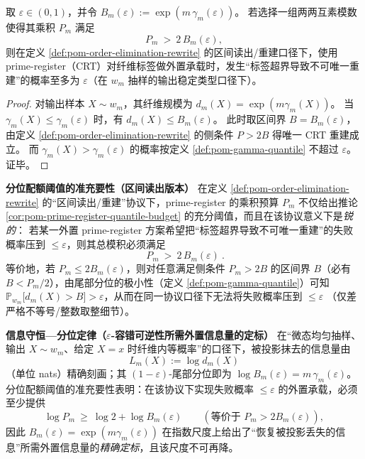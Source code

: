\begin{corollary}\label{cor:pom-prime-register-quantile-budget}
取 \(\varepsilon\in(0,1)\)，并令 \(B_m(\varepsilon):=\exp(m\,\gamma_m(\varepsilon))\)。
若选择一组两两互素模数使得其乘积 \(P_m\) 满足
$$
P_m\ >\ 2\,B_m(\varepsilon),
$$
则在定义 \ref{def:pom-order-elimination-rewrite} 的区间读出/重建口径下，使用 prime-register（CRT）对纤维标签做外置承载时，发生“标签超界导致不可唯一重建”的概率至多为 \(\varepsilon\)（在 \(w_m\) 抽样的输出稳定类型口径下）。
\end{corollary}

\begin{proof}
对输出样本 \(X\sim w_m\)，其纤维规模为 \(d_m(X)=\exp(m\gamma_m(X))\)。
当 \(\gamma_m(X)\le\gamma_m(\varepsilon)\) 时，有 \(d_m(X)\le B_m(\varepsilon)\)。
此时取区间界 \(B=B_m(\varepsilon)\)，由定义 \ref{def:pom-order-elimination-rewrite} 的侧条件 \(P>2B\) 得唯一 CRT 重建成立。
而 \(\gamma_m(X)>\gamma_m(\varepsilon)\) 的概率按定义 \ref{def:pom-gamma-quantile} 不超过 \(\varepsilon\)。证毕。
\end{proof}

\medskip\noindent\textbf{分位配额阈值的准充要性（区间读出版本）}
在定义 \ref{def:pom-order-elimination-rewrite} 的“区间读出/重建”协议下，prime-register 的乘积预算 \(P_m\) 不仅给出推论 \ref{cor:pom-prime-register-quantile-budget} 的充分阈值，而且在该协议意义下是\emph{锐的}：
若某一外置 prime-register 方案希望把“标签超界导致不可唯一重建”的失败概率压到 \(\le \varepsilon\)，则其总模积必须满足
\[
\boxed{\ P_m\ >\ 2\,B_m(\varepsilon)\ }.
\]
等价地，若 \(P_m\le 2B_m(\varepsilon)\)，则对任意满足侧条件 \(P_m>2B\) 的区间界 \(B\)（必有 \(B<P_m/2\)），由尾部分位的极小性（定义 \ref{def:pom-gamma-quantile}）可知
\(\mathbb{P}_{w_m}\!\big[d_m(X)>B\big]>\varepsilon\)，从而在同一协议口径下无法将失败概率压到 \(\le\varepsilon\)
（仅差严格不等号/整数取整细节）。

\medskip\noindent\textbf{信息守恒—分位定律（\(\varepsilon\)-容错可逆性所需外置信息量的定标）}
在“微态均匀抽样、输出 \(X\sim w_m\)、给定 \(X=x\) 时纤维内等概率”的口径下，被投影抹去的信息量由
\[
L_m(X):=\log d_m(X)
\]
（单位 nats）精确刻画；其 \((1-\varepsilon)\)-尾部分位即为
\(\log B_m(\varepsilon)=m\,\gamma_m(\varepsilon)\)。
分位配额阈值的准充要性表明：在该协议下实现失败概率 \(\le\varepsilon\) 的外置承载，必须至少提供
\[
\log P_m\ \ge\ \log 2+\log B_m(\varepsilon)
\qquad(\text{等价于 }P_m>2B_m(\varepsilon)),
\]
因此 \(B_m(\varepsilon)=\exp(m\gamma_m(\varepsilon))\) 在指数尺度上给出了“恢复被投影丢失的信息”所需外置信息量的\emph{精确定标}，且该尺度不可再降。

